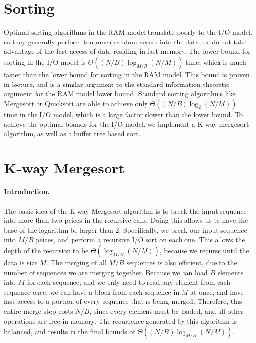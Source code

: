 \documentclass{article}
\begin{document}
\section{Sorting}
Optimal sorting algorithms in the RAM model translate poorly to the
I/O model, as they generally perform too much random access into the data,
or do not take advantage of the fast access of data residing in fast memory.
%
The lower bound for sorting in the I/O model is $\Theta((N/B)\log_{M/B}(N/M))$ time,
which is much faster than the lower bound for sorting in the RAM model.
%
This bound is proven in lecture, and is a similar argument to the standard
information theoretic argument for the RAM model lower bound.
%
Standard sorting algorithms like Mergesort or Quicksort are able to achieve
only $\Theta((N/B)\log_{2}(N/M))$ time in the I/O model, which is a large factor
slower than the lower bound.
%
To achieve the optimal bounds for the I/O model, we implement a K-way
mergesort algorithm, as well as a buffer tree based sort.

\section{K-way Mergesort}

\paragraph{Introduction.}
The basic idea of the K-way Mergesort algorithm is to break
the input sequence into more than two peices in
the recursive calls.
%
Doing this allows us to have the base of the logarithm be larger
than 2.
%
Specifically, we break our input sequence into $M/B$ peices,
and perform a recursive I/O sort on each one.
%
This allows the depth of the recursion to be $\Theta(\log_{M/B}(N/M))$,
because we recurse until the data is size $M$.
%
The merging of all $M/B$ sequences is also efficient, due to the number
of sequences we are merging together.
%
Because we can load $B$ elements into $M$ for each sequence, and
we only need to read any element from each sequence once, we can
have a block from each sequence in $M$ at once, and have
fast access to a portion of every sequence that is being merged.
%
Therefore, this entire merge step costs $N/B$, since every element must be
loaded, and all other operations are free in memory.
%
The recurrence generated by this algorithm is balanced, and results in
the final bounds of $\Theta((N/B)\log_{M/B}(N/M))$.
\end{document}
